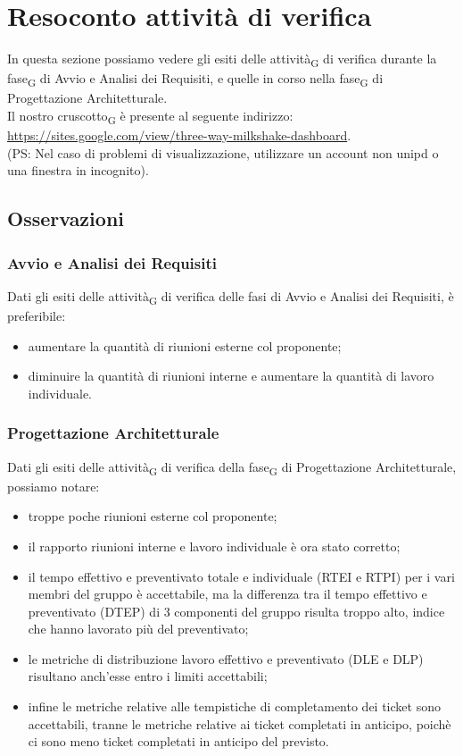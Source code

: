 
\section{Resoconto {attività} di verifica}
In questa sezione possiamo vedere gli esiti delle attività\textsubscript{G} di verifica durante la fase\textsubscript{G} di Avvio e Analisi dei Requisiti, e quelle in corso nella fase\textsubscript{G} di Progettazione Architetturale.\\
Il nostro cruscotto\textsubscript{G} è presente al seguente indirizzo:\\ \url{https://sites.google.com/view/three-way-milkshake-dashboard}.\\ (PS: Nel caso di problemi di visualizzazione, utilizzare un account non unipd o una finestra in incognito).
\pagebreak
\subsection{Osservazioni}
\subsubsection{Avvio e Analisi dei Requisiti}
Dati gli esiti delle attività\textsubscript{G} di verifica delle fasi di Avvio e Analisi dei Requisiti, è preferibile:
\begin{itemize}
	\item aumentare la quantità di riunioni esterne col proponente;
	\item diminuire la quantità di riunioni interne e aumentare la quantità di lavoro individuale.
\end{itemize}
\subsubsection{Progettazione Architetturale}
Dati gli esiti delle attività\textsubscript{G} di verifica della fase\textsubscript{G} di Progettazione Architetturale, possiamo notare:
\begin{itemize}
	\item troppe poche riunioni esterne col proponente;
	\item il rapporto riunioni interne e lavoro individuale è ora stato corretto;
	\item il tempo effettivo e preventivato totale e individuale (RTEI e RTPI) per i vari membri del gruppo è accettabile, ma la differenza tra il tempo effettivo e preventivato (DTEP) di 3 componenti del gruppo risulta troppo alto, indice che hanno lavorato più del preventivato;
	\item le metriche di distribuzione lavoro effettivo e preventivato (DLE e DLP) risultano anch'esse entro i limiti accettabili;
	\item infine le metriche relative alle tempistiche di completamento dei ticket sono accettabili, tranne le metriche relative ai ticket completati in anticipo, poichè ci sono meno ticket completati in anticipo del previsto.
\end{itemize}